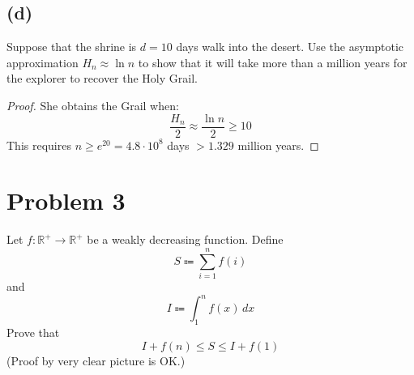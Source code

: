 \documentclass[14pt]{extarticle}
\begin{document}
\subsection{(d)}
Suppose that the shrine is $d = 10$ days walk into the desert. Use the asymptotic approximation $H_n \approx \ln n$ to show that it will take more than a million years for the explorer to recover the Holy Grail.
\begin{proof}
She obtains the Grail when:
$$
\frac{H_n}{2} \approx \frac{\ln n}{2} \geq 10
$$
This requires $n \geq e^{20} = 4.8 \cdot 10^8$ days $ > 1.329$ million years.
\end{proof}

\section{Problem 3}
Let $f : \mathbb{R}^+ \to \mathbb{R}^+$ be a weakly decreasing function. Define
$$
S \Coloneqq \sum_{i = 1}^{n} f(i)
$$
and
$$
I \Coloneqq \int_{1}^{n} f(x) \, dx
$$
Prove that
$$
I + f(n) \leq S \leq I + f(1)
$$
(Proof by very clear picture is OK.)
\end{document}
